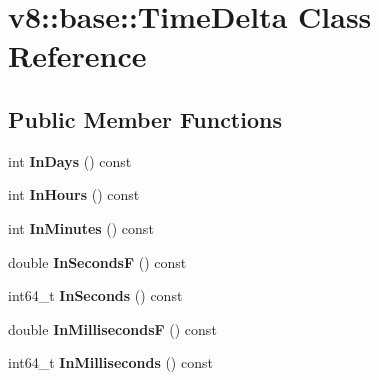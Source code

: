 \hypertarget{classv8_1_1base_1_1_time_delta}{}\section{v8\+:\+:base\+:\+:Time\+Delta Class Reference}
\label{classv8_1_1base_1_1_time_delta}
\subsection*{Public Member Functions}
\begin{DoxyCompactItemize}
\item 
int {\bfseries In\+Days} () const \hypertarget{classv8_1_1base_1_1_time_delta_a036bb05340df4e1529556c2a08b9fb2b}{}\label{classv8_1_1base_1_1_time_delta_a036bb05340df4e1529556c2a08b9fb2b}

\item 
int {\bfseries In\+Hours} () const \hypertarget{classv8_1_1base_1_1_time_delta_a899c2bef39de3cebcbae51a2facb8841}{}\label{classv8_1_1base_1_1_time_delta_a899c2bef39de3cebcbae51a2facb8841}

\item 
int {\bfseries In\+Minutes} () const \hypertarget{classv8_1_1base_1_1_time_delta_a73eb92ae74e92cb7a743023fc6eff4ec}{}\label{classv8_1_1base_1_1_time_delta_a73eb92ae74e92cb7a743023fc6eff4ec}

\item 
double {\bfseries In\+SecondsF} () const \hypertarget{classv8_1_1base_1_1_time_delta_a260d181d32dd5bfdf20e0e1c16b016d3}{}\label{classv8_1_1base_1_1_time_delta_a260d181d32dd5bfdf20e0e1c16b016d3}

\item 
int64\+\_\+t {\bfseries In\+Seconds} () const \hypertarget{classv8_1_1base_1_1_time_delta_a099da6f8f7897fc0a1de09f92da6c61c}{}\label{classv8_1_1base_1_1_time_delta_a099da6f8f7897fc0a1de09f92da6c61c}

\item 
double {\bfseries In\+MillisecondsF} () const \hypertarget{classv8_1_1base_1_1_time_delta_a2f8798a782ad0746c3396f97c5863a76}{}\label{classv8_1_1base_1_1_time_delta_a2f8798a782ad0746c3396f97c5863a76}

\item 
int64\+\_\+t {\bfseries In\+Milliseconds} () const \hypertarget{classv8_1_1base_1_1_time_delta_a4973b70b370ed37add95bb0fe4bd7ec7}{}\label{classv8_1_1base_1_1_time_delta_a4973b70b370ed37add95bb0fe4bd7ec7}


\end{DoxyCompactItemize}
